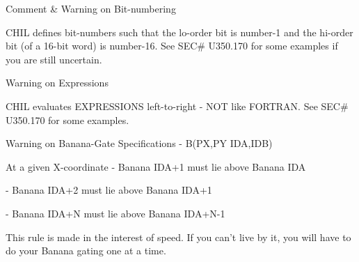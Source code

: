                        Comment & Warning on Bit-numbering
 
   CHIL defines bit-numbers such that the lo-order bit  is  number-1  and  the
   hi-order  bit  (of  a 16-bit word) is number-16. See SEC# U350.170 for some
   examples if you are still uncertain.
 
                             Warning on Expressions
 
   CHIL evaluates EXPRESSIONS left-to-right  -  NOT  like  FORTRAN.  See  SEC#
   U350.170 for some examples.
 
            Warning on Banana-Gate Specifications - B(PX,PY IDA,IDB)
 
   At a given X-coordinate - Banana IDA+1 must lie above Banana IDA
 
                           - Banana IDA+2 must lie above Banana IDA+1
 
                           - Banana IDA+N must lie above Banana IDA+N-1
 
   This  rule  is  made in the interest of speed. If you can't live by it, you
   will have to do your Banana gating one at a time.
